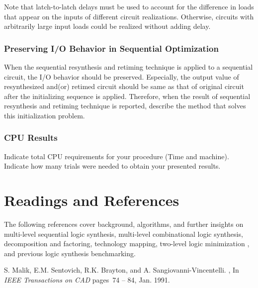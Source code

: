 {\begin{pespace}
\begin{itemize}
Note that latch-to-latch delays must be used to account for the
difference in loads that appear on the inputs of different
circuit realizations. Otherwise, circuits with 
arbitrarily large input loads could be realized 
without adding delay.


\end{itemize}

\subsubsection{ Preserving I/O Behavior in Sequential Optimization}
When the sequential resynthesis and retiming technique is applied to a sequential
circuit, the I/O behavior should be preserved. Especially, the output value of
resynthesized and(or) retimed circuit should be same as that of original
circuit after the initializing sequence is applied. 
Therefore, when the result of sequential resynthesis and retiming 
technique is reported, describe the method that
solves this initialization problem.


\subsubsection{CPU Results}
Indicate total CPU requirements for your procedure (Time and machine).
Indicate how many trials were needed to obtain your presented results. 

\newpage
\section{Readings and References}

The following references cover background, algorithms, and further
insights on 
multi-level sequential logic synthesis\cite{Malik91,DeMicheli91}, 
multi-level combinational 
logic synthesis\cite{Bostick87,Lisanke87}, decomposition
and factoring\cite{Brayton82,Brayton84}, 
technology mapping\cite{gregory86,keutzer87,lisanke88b}, 
two-level logic minimization \cite{BrHa84,Rudell86},
and previous logic synthesis
benchmarking\cite{Degeus86,lisanke89}.

\begin{thebibliography}{10}

S. Malik, E.M. Sentovich, R.K. Brayton, and A. Sangiovanni-Vincentelli.
,
\newblock In {\it IEEE Transactions on CAD} pages~74 -- 84, Jan. 1991.


\end{thebibliography}
\end{pespace}}
